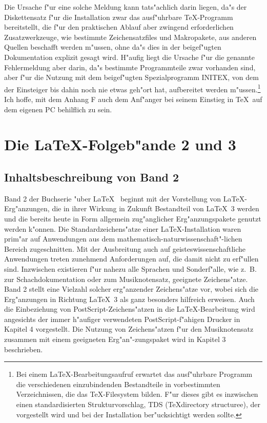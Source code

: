 \documentclass{report}
\begin{document}
Die Ursache f"ur eine solche Meldung kann tats"achlich darin liegen, da"s
der Diskettensatz f"ur die Installation zwar das ausf"uhrbare \TeX-Programm
bereitstellt, die f"ur den praktischen Ablauf aber zwingend erforderlichen
Zusatzwerkzeuge, wie bestimmte Zeichensatzfiles und Makropakete, aus anderen
Quellen beschafft werden m"ussen, ohne da"s dies in der beigef"ugten
Dokumentation explizit gesagt wird. H"aufig liegt die Ursache f"ur die
genannte Fehlermeldung aber darin, da"s bestimmte Programmteile zwar vorhanden
sind, aber f"ur die Nutzung mit dem beigef"ugten Spezialprogramm INITEX, 
von dem der Einsteiger bis dahin noch nie etwas geh"ort hat, aufbereitet werden
m"ussen.\footnote{Bei einem \LaTeX-Bearbeitungsaufruf erwartet das ausf"uhrbare
Programm die verschiedenen einzubindenden Bestandteile in vorbestimmten
Verzeichnissen, die das \TeX-Filesystem bilden. F"ur dieses gibt es inzwischen
einen standardisierten Strukturvorschlag, TDS (\TeX directory structuree),
der vorgestellt wird und bei der Installation ber"ucksichtigt werden sollte.}
Ich hoffe, mit dem Anhang F auch dem Anf"anger bei seinem Einstieg in \TeX\
auf dem eigenen PC behilflich  zu sein.

\section{Die \LaTeX-Folgeb"ande 2 und 3}
\subsection{Inhaltsbeschreibung von Band 2}
Band 2 der Buchserie "uber \LaTeX\ \cite{hk2} beginnt mit der Vorstellung von 
\LaTeX-Erg"anzungen, die in ihrer Wirkung in Zukunft Bestandteil von
\LaTeX~3 werden und die bereits heute in Form allgemein zug"anglicher
Erg"anzungspakete genutzt werden k"onnen. Die Standardzeichens"atze einer
\LaTeX-Installation waren prim"ar auf Anwendungen aus dem
mathematisch-naturwissenschaft"-lichen Bereich zugeschnitten. 
Mit der Ausbreitung auch auf geisteswissenschaftliche Anwendungen treten
zunehmend Anforderungen auf, die damit nicht zu erf"ullen sind. Inzwischen
existieren f"ur nahezu alle Sprachen und Sonderf"alle, wie z.~B. zur
Schachdokumentation oder zum Musiknotensatz, geeignete Zeichens"atze.
Band 2 stellt eine Vielzahl solcher erg"anzender Zeichens"atze vor, wobei sich
die Erg"anzungen in Richtung \LaTeX~3 als ganz besonders hilfreich erweisen.
Auch die Einbeziehung von PostScript-Zeichens"atzen in die \LaTeX-Bearbeitung
wird angesichts der immer h"aufiger verwendeten PostScript-f"ahigen Drucker
in Kapitel 4 vorgestellt. Die Nutzung von Zeichens"atzen f"ur den Musiknotensatz
zusammen mit einem geeigneten Erg"an"-zungspaket wird in  Kapitel 3 beschrieben. 
\end{document}
